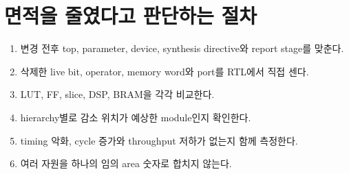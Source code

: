 \section{면적을 줄였다고 판단하는 절차}

\begin{checklistbox}
\begin{enumerate}
  \item 변경 전후 top, parameter, device, synthesis directive와 report stage를 맞춘다.
  \item 삭제한 live bit, operator, memory word와 port를 RTL에서 직접 센다.
  \item LUT, FF, slice, DSP, BRAM을 각각 비교한다.
  \item hierarchy별로 감소 위치가 예상한 module인지 확인한다.
  \item timing 악화, cycle 증가와 throughput 저하가 없는지 함께 측정한다.
  \item 여러 자원을 하나의 임의 area 숫자로 합치지 않는다.
\end{enumerate}
\end{checklistbox}
